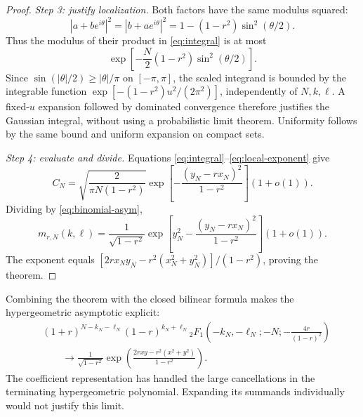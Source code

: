 \documentclass[11pt,reqno]{amsart}
\theoremstyle{definition}
\theoremstyle{remark}
\begin{document}
\begin{proof}
\smallskip\noindent\emph{Step 3: justify localization.}
Both factors have the same modulus squared:
\[
|a+be^{i\theta}|^2=|b+ae^{i\theta}|^2
=1-(1-r^2)\sin^2(\theta/2).
\]
Thus the modulus of their product in \eqref{eq:integral} is at most
\[
\exp\left[-\frac N2(1-r^2)\sin^2(\theta/2)\right].
\]
Since $\sin(|\theta|/2)\ge |\theta|/\pi$ on $[-\pi,\pi]$, the scaled
integrand is bounded by the integrable function
$\exp[-(1-r^2)u^2/(2\pi^2)]$, independently of $N,k,\ell$.
A fixed-$u$ expansion followed by dominated convergence therefore
justifies the Gaussian integral, without using a probabilistic limit
theorem. Uniformity follows by the same bound and uniform expansion
on compact sets.

\smallskip\noindent\emph{Step 4: evaluate and divide.}
Equations \eqref{eq:integral}--\eqref{eq:local-exponent} give
\begin{equation}\label{eq:numerator-asym}
C_N=\sqrt{\frac{2}{\pi N(1-r^2)}}
\exp\left[-\frac{(y_N-rx_N)^2}{1-r^2}\right](1+o(1)).
\end{equation}
Dividing by \eqref{eq:binomial-asym},
\[
m_{r,N}(k,\ell)
=\frac1{\sqrt{1-r^2}}
\exp\left[y_N^2-\frac{(y_N-rx_N)^2}{1-r^2}\right](1+o(1)).
\]
The exponent equals
$[2rx_Ny_N-r^2(x_N^2+y_N^2)]/(1-r^2)$, proving the theorem.
\end{proof}

Combining the theorem with the closed bilinear formula makes the
hypergeometric asymptotic explicit:
\begin{equation}\label{eq:hypergeo-limit}
\begin{aligned}
&(1+r)^{N-k_N-\ell_N}(1-r)^{k_N+\ell_N}
{}_2F_1\left(-k_N,-\ell_N;-N;-\frac{4r}{(1-r)^2}\right)\\
&\hspace{2em}\longrightarrow
\frac1{\sqrt{1-r^2}}
\exp\left(\frac{2rxy-r^2(x^2+y^2)}{1-r^2}\right).
\end{aligned}
\end{equation}
The coefficient representation has handled the large cancellations in
the terminating hypergeometric polynomial. Expanding its summands
individually would not justify this limit.
\end{document}
